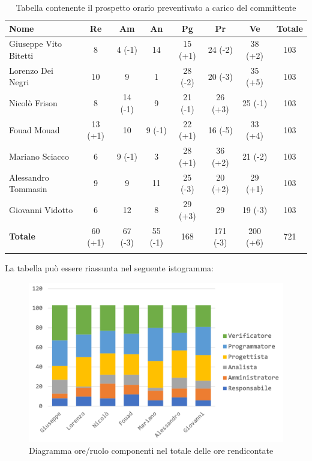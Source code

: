 		\begin{longtable}{|l|c|c|c|c|c|c|c|}
			\hline
			\rowcolor{lighter-grayer}
			\textbf{Nome} & \textbf{Re} & \textbf{Am} & \textbf{An} & \textbf{Pg}  & \textbf{Pr}   & \textbf{Ve} & \textbf{Totale} \\
			\hline
			\endfirsthead
			
			\hline
			Giuseppe Vito Bitetti 		& 8 & 4 (-1) & 14 & 15 (+1) & 24 (-2) & 38 (+2) & 103\\
			\hline
			\hline
			Lorenzo Dei Negri			& 10 & 9 & 1 & 28 (-2) & 20 (-3) & 35 (+5) & 103\\
			\hline
			\hline
			Nicolò Frison				    & 8 & 14 (-1) & 9 & 21 (-1) & 26 (+3) & 25 (-1) & 103\\
			\hline
			\hline
			Fouad Mouad 				 & 13 (+1) & 10 & 9 (-1) & 22 (+1) & 16 (-5) & 33 (+4) & 103\\
			\hline
			\hline
			Mariano Sciacco 			& 6 & 9 (-1) & 3 & 28 (+1) & 36 (+2) & 21 (-2) & 103\\
			\hline
			\hline
			Alessandro Tommasin    & 9 & 9 & 11 & 25 (-3) & 20 (+2) & 29 (+1) & 103\\
			\hline
			\hline
			Giovanni Vidotto 			 & 6 & 12 & 8 & 29 (+3) & 29 & 19 (-3) & 103\\
			\hline 
			\textbf{Totale}				 & 60 (+1) & 67 (-3) & 55 (-1) & 168 & 171 (-3) & 200 (+6) & 721\\
			\hline
			\caption{Tabella contenente il prospetto orario preventivato a carico del committente}
		\end{longtable}
		
		La tabella può essere riassunta nel seguente istogramma:
		\begin{figure}[H]
			\centering
			\includegraphics[width=0.8\linewidth]{./images/preventivo/totOreRed1.png}
			\caption{Diagramma ore/ruolo componenti nel totale delle ore rendicontate}
			\label{fig:diagramma suddivione ruoli totale ore rendicontete}
		\end{figure}
		\pagebreak
		
